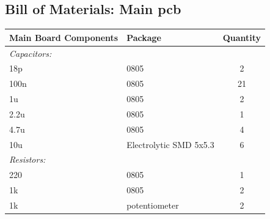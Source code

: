 \subsection{Bill of Materials: Main \gls{pcb}}
\begin{center}
\begin{tabular}{|l|l|c|}
	\hline
	\bf{Main Board Components} & \bf{Package} & \bf{Quantity} \\
	\hline
	\emph{Capacitors:} & & \\
	\hline
	18p & 0805 & 2 \\
	\hline
	100n & 0805 & 21 \\
	\hline
	1u & 0805 & 2 \\
	\hline 
	2.2u & 0805 & 1 \\
	\hline 
	4.7u & 0805 & 4 \\
	\hline 
	10u & Electrolytic SMD 5x5.3 & 6 \\
	\hline
	\emph{Resistors:} & & \\
	\hline
	220 & 0805 & 1 \\
	\hline
	1k & 0805 & 2 \\
	\hline
	1k & potentiometer & 2 \\
	\hline

\end{tabular}
\end{center}

